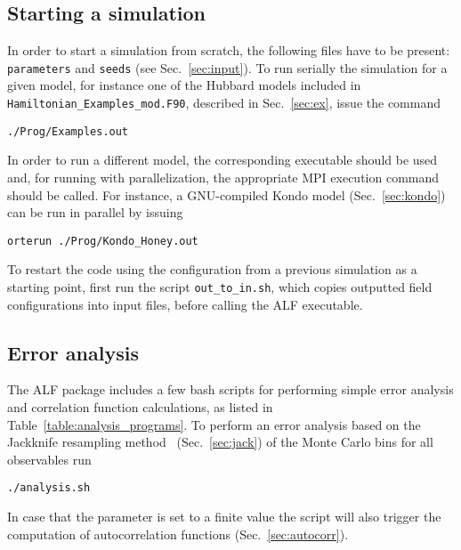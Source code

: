 %
\subsection*{Starting a simulation}
%
In order to start a simulation from scratch, the following files have to be present: \texttt{parameters} and \texttt{seeds} (see Sec.~\ref{sec:input}). 
To run serially the simulation for a given model, for instance one of the Hubbard models included in \texttt{Hamiltonian\_Examples\_mod.F90}, described in Sec.~\ref{sec:ex}, issue the command
\begin{lstlisting}[style=bash]
./Prog/Examples.out
\end{lstlisting}
In order to run a different model, the corresponding executable should be used and, for running with parallelization, the appropriate MPI execution command should be called. For instance, a GNU-compiled Kondo model (Sec.~\ref{sec:kondo}) can be run in parallel by issuing
\begin{lstlisting}[style=bash]
orterun ./Prog/Kondo_Honey.out
\end{lstlisting}

To restart the code using the configuration from a previous simulation as a starting point, first run the script \texttt{out\_to\_in.sh}, which copies outputted field configurations into input files, before calling the ALF executable.

%
\subsection{Error analysis}\label{sec:analysis}
%

The ALF package includes a few bash scripts for performing simple error analysis and correlation function calculations, as listed in Table~\ref{table:analysis_programs}. 
To perform an error analysis based on the Jackknife resampling method~\cite{efron1981} (Sec.~\ref{sec:jack}) of the Monte Carlo bins for all observables run
\begin{lstlisting}[style=bash]
./analysis.sh
\end{lstlisting}
In case that the parameter  is set to a finite value the script will also trigger the computation of autocorrelation functions (Sec.~\ref{sec:autocorr}).


